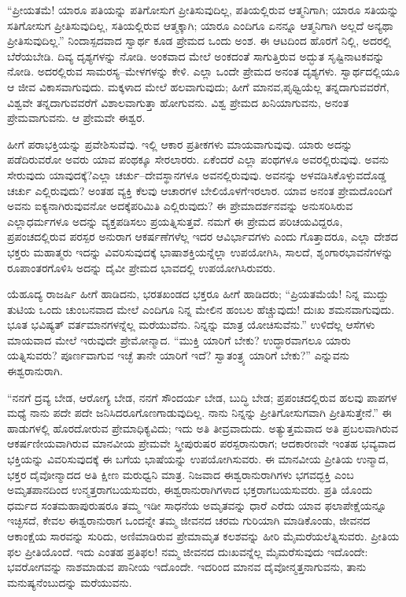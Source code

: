 \vskip 0.2cm

“ಪ್ರೀಯತಮೆ! ಯಾರೂ ಪತಿಯನ್ನು ಪತಿಗೋಸುಗ ಪ್ರೀತಿಸುವುದಿಲ್ಲ, ಪತಿಯಲ್ಲಿರುವ ಆತ್ಮನಿಗಾಗಿ; ಯಾರೂ ಸತಿಯನ್ನು ಸತಿಗೋಸುಗ ಪ್ರೀತಿಸುವುದಿಲ್ಲ, ಸತಿಯಲ್ಲಿರುವ ಆತ್ಮಕ್ಕಾಗಿ; ಯಾರೂ ಎಂದಿಗೂ ಏನನ್ನೂ ಆತ್ಮನಿಗಾಗಿ ಅಲ್ಲದೆ ಅನ್ಯಥಾ ಪ್ರೀತಿಸುವುದಿಲ್ಲ.” ನಿಂದಾಸ್ಪದವಾದ ಸ್ವಾರ್ಥ ಕೂಡ ಪ್ರೇಮದ ಒಂದು ಅಂಶ. ಈ ಆಟದಿಂದ ಹೊರಗೆ ನಿಲ್ಲಿ, ಅದರಲ್ಲಿ ಬೆರೆಯಬೇಡಿ. ದಿವ್ಯ ದೃಶ್ಯಗಳನ್ನು ನೋಡಿ. ಅಂಕವಾದ ಮೇಲೆ ಅಂಕದಂತೆ ಸಾಗುತ್ತಿರುವ ಅದ್ಭುತ ಸೃಷ್ಟಿನಾಟಕವನ್ನು ನೋಡಿ. ಅದರಲ್ಲಿರುವ ಸಾಮರಸ್ಯ–ಮೇಳಗಳನ್ನು ಕೇಳಿ. ಎಲ್ಲಾ ಒಂದೇ ಪ್ರೇಮದ ಅನಂತ ದೃಶ್ಯಗಳು. ಸ್ವಾರ್ಥದಲ್ಲಿಯೂ ಆ ಜೀವ ವಿಕಾಸವಾಗುವುದು. ಮಕ್ಕಳಾದ ಮೇಲೆ ಹಲವಾಗುವುದು; ಹೀಗೆ ಮಾನವ,\break ಪೃಥ್ವಿಯೆಲ್ಲ ತನ್ನದಾಗುವವರೆಗೆ, ವಿಶ್ವವೇ ತನ್ನದಾಗುವವರೆಗೆ ವಿಶಾಲವಾಗುತ್ತಾ ಹೋಗುವನು. ವಿಶ್ವ ಪ್ರೇಮದ ಖನಿಯಾಗುವನು, ಅನಂತ ಪ್ರೇಮವಾಗುವನು. ಆ ಪ್ರೇಮವೇ ಈಶ್ವರ.

\vskip 0.2cm

ಹೀಗೆ ಪರಾಭಕ್ತಿಯನ್ನು ಪ್ರವೇಶಿಸುವೆವು. ಇಲ್ಲಿ ಆಕಾರ ಪ್ರತೀಕಗಳು ಮಾಯವಾಗುವುವು. ಯಾರು ಅದನ್ನು ಪಡೆದಿರುವರೋ ಅವರು ಯಾವ ಪಂಥಕ್ಕೂ ಸೇರಲಾರರು. ಏಕೆಂದರೆ ಎಲ್ಲಾ ಪಂಥಗಳೂ ಅವರಲ್ಲಿರುವುವು. ಅವನು ಸೇರುವುದು ಯಾವುದಕ್ಕೆ?\break ಎಲ್ಲಾ ಚರ್ಚು–ದೇವಸ್ಥಾನಗಳೂ ಅವನಲ್ಲಿರುವುವು. ಅವನನ್ನು ಅಳವಡಿಸಿಕೊಳ್ಳುವ\break ದೊಡ್ಡ ಚರ್ಚು ಎಲ್ಲಿರುವುದು? ಅಂತಹ ವ್ಯಕ್ತಿ ಕೆಲವು ಆಚಾರಗಳ ಬೇಲಿಯೊಳಗೆ\break ಇರಲಾರ. ಯಾವ ಅನಂತ ಪ್ರೇಮದೊಂದಿಗೆ ಅವನು ಐಕ್ಯನಾಗಿರುವುವನೋ ಅದಕ್ಕೆ\break ಪರಿಮಿತಿ ಎಲ್ಲಿರುವುದು? ಈ ಪ್ರೇಮಾದರ್ಶನವನ್ನು ಅನುಸರಿಸಿರುವ ಎಲ್ಲಾ\break ಧರ್ಮಗಳೂ ಅದನ್ನು ವ್ಯಕ್ತಪಡಿಸಲು ಪ್ರಯತ್ನಿಸುತ್ತವೆ. ನಮಗೆ ಈ ಪ್ರೇಮದ ಪರಿಚಯವಿದ್ದರೂ, ಪ್ರಪಂಚದಲ್ಲಿರುವ ಪರಸ್ಪರ ಅನುರಾಗ ಆಕರ್ಷಣೆಗಳೆಲ್ಲ ಇದರ ಆವಿರ್ಭಾವಗಳು ಎಂದು ಗೊತ್ತಾದರೂ, ಎಲ್ಲಾ ದೇಶದ ಭಕ್ತರು ಮಹಾತ್ಮರು ಇದನ್ನು ವಿವರಿಸುವುದಕ್ಕೆ ಭಾಷಾಶಕ್ತಿಯನ್ನೆಲ್ಲಾ ಉಪಯೋಗಿಸಿ, ಸಾಲದೆ, ಶೃಂಗಾರಭಾವನೆಗಳನ್ನು ರೂಪಾಂತರಗೊಳಿಸಿ ಅದನ್ನು ದೈವೀ ಪ್ರೇಮದ ಭಾವದಲ್ಲಿ ಉಪಯೋಗಿಸಿರುವರು.

ಯೆಹೂದ್ಯ ರಾಜರ್ಷಿ ಹೀಗೆ ಹಾಡಿದನು, ಭರತಖಂಡದ ಭಕ್ತರೂ ಹೀಗೆ ಹಾಡಿದರು; “ಪ್ರಿಯತಮೆಯೆ! ನಿನ್ನ ಮುದ್ದು ತುಟಿಯ ಒಂದು ಚುಂಬನವಾದ ಮೇಲೆ ಎಂದಿಗೂ ನಿನ್ನ ಮೇಲಿನ ಹಂಬಲ ಹೆಚ್ಚುವುದು! ದುಃಖ ಶಮನವಾಗುವುದು. ಭೂತ ಭವಿಷ್ಯತ್​ ವರ್ತಮಾನಗಳನ್ನೆಲ್ಲ ಮರೆಯುವೆನು. ನಿನ್ನನ್ನು ಮಾತ್ರ ಯೋಚಿಸುವೆನು.” ಉಳಿದೆಲ್ಲ ಆಸೆಗಳು ಮಾಯವಾದ ಮೇಲೆ ಇರುವುದೇ ಪ್ರೇಮೋನ್ಮಾದ. “ಮುಕ್ತಿ ಯಾರಿಗೆ ಬೇಕು? ಉದ್ಧಾರ\-ವಾಗಲೂ ಯಾರು ಯತ್ನಿಸುವರು? ಪೂರ್ಣವಾಗುವ ಇಚ್ಛೆ ತಾನೇ ಯಾರಿಗೆ ಇದೆ? ಸ್ವಾತಂತ್ರ್ಯ ಯಾರಿಗೆ ಬೇಕು?” ಎನ್ನುವನು ಈಶ್ವರಾನುರಾಗಿ.

“ನನಗೆ ದ್ರವ್ಯ ಬೇಡ, ಆರೋಗ್ಯ ಬೇಡ, ನನಗೆ ಸೌಂದರ್ಯ ಬೇಡ, ಬುದ್ಧಿ ಬೇಡ; ಪ್ರಪಂಚದಲ್ಲಿರುವ ಹಲವು ಪಾಪಗಳ ಮಧ್ಯೆ ನಾನು ಪದೇ ಪದೇ ಜನಿಸಿದರೂ\break ಗೊಣಗಾಡುವುದಿಲ್ಲ. ನಾನು ನಿನ್ನನ್ನು ಪ್ರೀತಿಗೋಸುಗವಾಗಿ ಪ್ರೀತಿಸುತ್ತೇನೆ.” ಈ ಹಾಡುಗಳಲ್ಲಿ ಹೊರದೋರುವ ಪ್ರೇಮಾಧಿಕ್ಯವಿದು; ಇದು ಅತಿ ತೀವ್ರವಾದುದು. ಅತ್ಯುತ್ತಮವಾದ ಅತಿ ಪ್ರಬಲವಾಗಿರುವ ಆಕರ್ಷಣೀಯವಾಗಿರುವ ಮಾನವೀಯ ಪ್ರೇಮವೇ ಸ್ತ್ರೀಪುರುಷರ ಪರಸ್ಪರಾನುರಾಗ; ಆದಕಾರಣವೇ ಇಂತಹ ಭವ್ಯವಾದ ಭಕ್ತಿಯನ್ನು ವಿವರಿಸುವುದಕ್ಕೆ ಈ ಬಗೆಯ ಭಾಷೆಯನ್ನು ಉಪಯೋಗಿಸುವರು. ಈ ಮಾನವೀಯ ಪ್ರೀತಿಯ ಉನ್ಮಾದ, ಭಕ್ತರ ದೈವೋನ್ಮಾದದ ಅತಿ ಕ್ಷೀಣ ಮರುಧ್ವನಿ ಮಾತ್ರ. ನಿಜವಾದ ಈಶ್ವರಾನುರಾಗಿಗಳು ಭಗವದ್ಭಕ್ತಿ ಎಂಬ ಅಮೃತಪಾನದಿಂದ ಉನ್ಮತ್ತರಾಗಬಯಸುವರು, ಈಶ್ವರಾನುರಾಗಿಗಳಾದ ಭಕ್ತರಾಗಬಯಸುವರು. ಪ್ರತಿ ಯೊಂದು ಧರ್ಮದ ಸಂತಮಹಾಪುರುಷರೂ ತಮ್ಮ ಇಡೀ ಸಾಧನೆಯ ಅಮೃತವನ್ನು ಧಾರೆ ಎರೆದು ಯಾವ ಫಲಾಪೇಕ್ಷೆಯನ್ನೂ ಇಚ್ಛಿಸದೆ, ಕೇವಲ ಈಶ್ವರಾನುರಾಗ ಒಂದನ್ನೇ ತಮ್ಮ ಜೀವನದ ಚರಮ ಗುರಿಯಾಗಿ ಮಾಡಿಕೊಂಡು, ಜೀವನದ ಆಕಾಂಕ್ಷೆಯ ಸಾರವನ್ನು ಸುರಿದು, ಅಣಿಮಾಡಿರುವ ಪ್ರೇಮಾಮೃತ ಕಲಶವನ್ನು ಹೀರಿ ಮೈಮರೆಯಲೆತ್ನಿಸುವರು. ಪ್ರೀತಿಯ ಫಲ ಪ್ರೀತಿಯೊಂದೆ. ಇದು ಎಂತಹ ಪ್ರತಿಫಲ! ನಮ್ಮ ಜೀವನದ ದುಃಖವನ್ನೆಲ್ಲ ಮೈಮರೆಸುವುದು ಇದೊಂದೇ: ಭವರೋಗವನ್ನು ನಾಶಮಾಡುವ ಪಾನೀಯ ಇದೊಂದೇ. ಇದರಿಂದ ಮಾನವ ದೈವೋನ್ಮತ್ತನಾಗುವನು, ತಾನು ಮನುಷ್ಯನೆಂಬುದನ್ನು ಮರೆಯುವನು.

